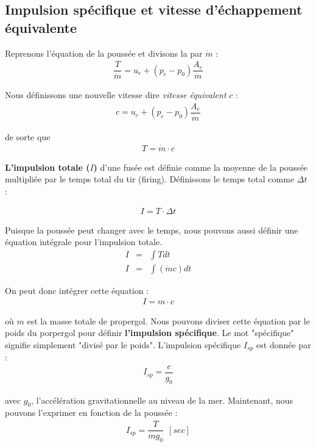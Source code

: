 \documentclass{report}
\begin{document}
\subsection{Impulsion spécifique et vitesse d'échappement équivalente}

Reprenons l'équation de la poussée et divisons la par $\dot{m}$ :
\begin{eqnarray}
\dfrac{T}{\dot{m}} = u_e+(p_e-p_0)\dfrac{A_e}{\dot{m}}
\end{eqnarray}

Nous définissons une nouvelle vitesse dire \textit{vitesse équivalent} $c$ :
\begin{eqnarray}
c = u_e+(p_e-p_0)\dfrac{A_e}{\dot{m}}
\end{eqnarray}

de sorte que
\begin{eqnarray}
T = \dot{m} \cdot c
\end{eqnarray}

\textbf{L'impulsion totale ($I$)} d'une fusée est définie comme la moyenne de la poussée multipliée par le temps total du tir (firing). Définissons le temps total comme $\Delta t$ :

\begin{eqnarray}
I=T\cdot\Delta t
\end{eqnarray}

Puisque la poussée peut changer avec le temps, nous pouvons aussi définir une équation intégrale pour l'impulsion totale. 
\begin{eqnarray}
I &= &\int T dt\\
I &= &\int(\dot{m} c)dt
\end{eqnarray}

On peut donc intégrer cette équation :
\begin{eqnarray}
I = m\cdot c
\end{eqnarray}

où $m$ est la masse totale de propergol. Nous pouvons diviser cette équation par le poids du porpergol pour définir \textbf{l'impulsion spécifique}. Le mot "spécifique" signifie simplement "divisé par le poids". L'impulsion spécifique $I_{sp}$ est donnée par :
\begin{eqnarray}
I_{sp}  = \dfrac{c}{g_0}
\end{eqnarray}

avec $g_0$, l'accélération gravitationnelle au niveau de la mer. Maintenant, nous pouvons l'exprimer en fonction de la poussée :
\begin{eqnarray}
I_{sp} = \dfrac{T}{\dot{m} g_0}~~[sec]
\end{eqnarray}
\end{document}
